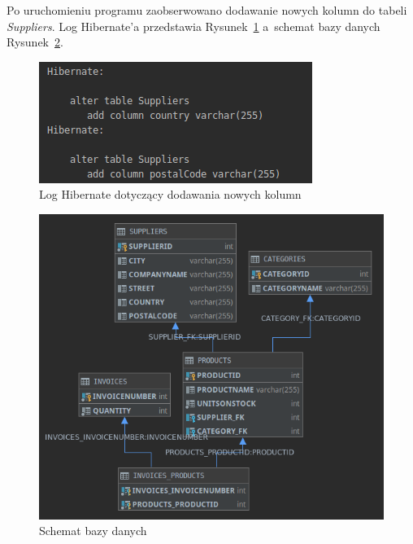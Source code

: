 \documentclass[12pt, a4paper]{mwart}
\begin{document}
Po uruchomieniu programu zaobserwowano dodawanie nowych kolumn do tabeli \textit{Suppliers}. Log Hibernate'a przedstawia Rysunek~\ref{rys:10.1} a~schemat bazy danych Rysunek~\ref{rys:10.2}.

\begin{figure}[ht]
  \centering
  \includegraphics[scale=0.5]{X/10-1.png}
  \caption{Log Hibernate dotyczący dodawania nowych kolumn}
  \label{rys:10.1}
\end{figure}

\begin{figure}[ht]
  \centering
  \includegraphics[scale=0.5]{X/10-2.png}
  \caption{Schemat bazy danych}
  \label{rys:10.2}
\end{figure}
\end{document}
